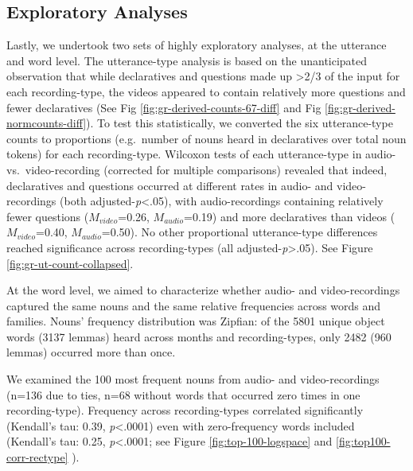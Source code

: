 \documentclass[man]{apa6}
\theoremstyle{definition}
\theoremstyle{definition}
\theoremstyle{definition}
\theoremstyle{remark}
\begin{document}
\subsection{Exploratory Analyses}\label{exploratory-analyses}

Lastly, we undertook two sets of highly exploratory analyses, at the
utterance and word level. The utterance-type analysis is based on the
unanticipated observation that while declaratives and questions made up
\textgreater{}2/3 of the input for each recording-type, the videos
appeared to contain relatively more questions and fewer declaratives
(See Fig \ref{fig:gr-derived-counts-67-diff} and Fig
\ref{fig:gr-derived-normcounts-diff}). To test this statistically, we
converted the six utterance-type counts to proportions (e.g.~number of
nouns heard in declaratives over total noun tokens) for each
recording-type. Wilcoxon tests of each utterance-type in audio-
vs.~video-recording (corrected for multiple comparisons) revealed that
indeed, declaratives and questions occurred at different rates in audio-
and video-recordings (both adjusted-\emph{p}\textless{}.05), with
audio-recordings containing relatively fewer questions
(\(M_{video}\)=0.26, \(M_{audio}\)=0.19) and more declaratives than
videos (\(M_{video}\)=0.40, \(M_{audio}\)=0.50). No other proportional
utterance-type differences reached significance across recording-types
(all adjusted-\emph{p}\textgreater{}.05). See Figure
\ref{fig:gr-ut-count-collapsed}.

At the word level, we aimed to characterize whether audio- and
video-recordings captured the same nouns and the same relative
frequencies across words and families. Nouns' frequency distribution was
Zipfian: of the 5801 unique object words (3137 lemmas) heard across
months and recording-types, only 2482 (960 lemmas) occurred more than
once.

We examined the 100 most frequent nouns from audio- and video-recordings
(n=136 due to ties, n=68 without words that occurred zero times in one
recording-type). Frequency across recording-types correlated
significantly (Kendall's tau: 0.39, \emph{p}\textless{}.0001) even with
zero-frequency words included (Kendall's tau: 0.25,
\emph{p}\textless{}.0001; see Figure \ref{fig:top-100-logspace} and
\ref{fig:top100-corr-rectype} ).
\end{document}
